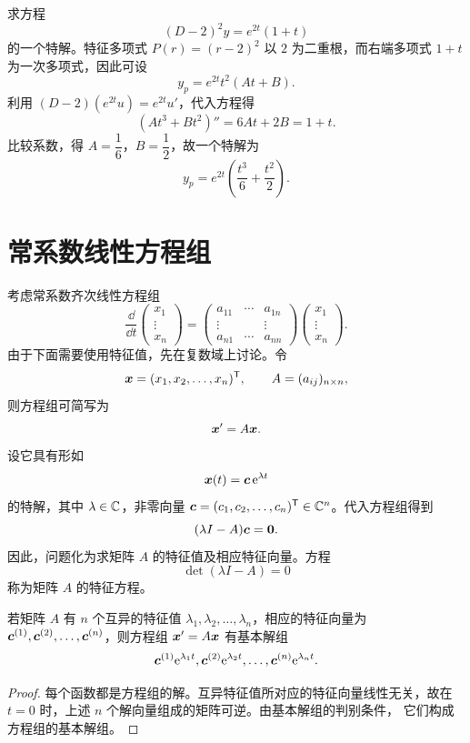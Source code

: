 \begin{example}
求方程
\[
 (D-2)^2y=e^{2t}(1+t)
\]
的一个特解。特征多项式 $P(r)=(r-2)^2$ 以 $2$ 为二重根，而右端多项式 $1+t$ 为一次多项式，因此可设
\[
 y_p=e^{2t}t^2(At+B).
\]
利用 $(D-2)(e^{2t}u)=e^{2t}u'$，代入方程得
\[
 (At^3+Bt^2)''=6At+2B=1+t.
\]
比较系数，得 $A=\dfrac16$，$B=\dfrac12$，故一个特解为
\[
 y_p=e^{2t}\left(\frac{t^3}{6}+\frac{t^2}{2}\right).
\]
\end{example}

\section{常系数线性方程组}\label{sec:常系数线性方程组}

考虑常系数齐次线性方程组
\[
	\dfrac{\dd}{\dd t}
	\begin{pmatrix}
		x_1\\
		\vdots\\
		x_n
	\end{pmatrix}
	=
	\begin{pmatrix}
		a_{11}&\cdots&a_{1n}\\
		\vdots&&\vdots\\
		a_{n1}&\cdots&a_{nn}
	\end{pmatrix}
	\begin{pmatrix}
		x_1\\
		\vdots\\
		x_n
	\end{pmatrix}.
\]
由于下面需要使用特征值，先在复数域上讨论。令
\[
	\boldsymbol{x}=(x_1,x_2,\ldots,x_n)^{\mathsf T},
	\qquad
	A=(a_{ij})_{n\times n},
\]
则方程组可简写为
\[
	\boldsymbol{x}'=A\boldsymbol{x}.
\]
设它具有形如
\[
	\boldsymbol{x}(t)=\boldsymbol{c}\,\mathrm{e}^{\lambda t}
\]
的特解，其中 $\lambda\in\mathbb{C}$，非零向量
$\boldsymbol{c}=(c_1,c_2,\ldots,c_n)^{\mathsf T}\in\mathbb{C}^n$。代入方程组得到
\[
	(\lambda I-A)\boldsymbol{c}=\boldsymbol{0}.
\]
因此，问题化为求矩阵 $A$ 的特征值及相应特征向量。方程
\[
	\det(\lambda I-A)=0
\]
称为矩阵 $A$ 的特征方程。

\begin{proposition}\label{thm:互异特征值常系数方程组的基本解组}
	若矩阵 $A$ 有 $n$ 个互异的特征值
	$\lambda_1,\lambda_2,\ldots,\lambda_n$，相应的特征向量为
	$\boldsymbol{c}^{(1)},\boldsymbol{c}^{(2)},\ldots,\boldsymbol{c}^{(n)}$，则方程组
	$\boldsymbol{x}'=A\boldsymbol{x}$ 有基本解组
	\[
		\boldsymbol{c}^{(1)}\mathrm{e}^{\lambda_1t},
		\boldsymbol{c}^{(2)}\mathrm{e}^{\lambda_2t},
		\ldots,
		\boldsymbol{c}^{(n)}\mathrm{e}^{\lambda_nt}.
	\]
\end{proposition}

\begin{proof}
	每个函数都是方程组的解。互异特征值所对应的特征向量线性无关，故在
	$t=0$ 时，上述 $n$ 个解向量组成的矩阵可逆。由基本解组的判别条件，
	它们构成方程组的基本解组。
\end{proof}

